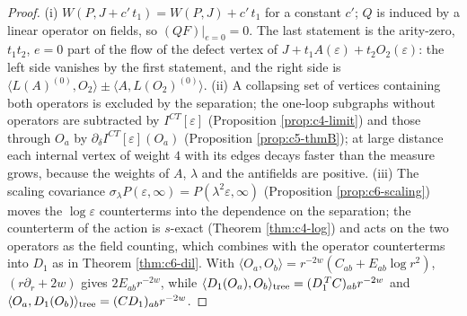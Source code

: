 \begin{proof}
(i) $W(P,J+c'\,t_1)=W(P,J)+c'\,t_1$ for a constant $c'$; $Q$ is induced by a linear operator on fields, so $(QF)|_{e=0}=0$. The last statement is the arity-zero, $t_1t_2$, $e=0$ part of the flow of the defect vertex of $J+t_1A(\varepsilon)+t_2O_2(\varepsilon)$: the left side vanishes by the first statement, and the right side is $\langle L(A)^{(0)},O_2\rangle\pm\langle A,L(O_2)^{(0)}\rangle$. (ii) A collapsing set of vertices containing both operators is excluded by the separation; the one-loop subgraphs without operators are subtracted by $I^{CT}[\varepsilon]$ (Proposition \ref{prop:c4-limit}) and those through $O_a$ by $\partial_\delta I^{CT}[\varepsilon](O_a)$ (Proposition \ref{prop:c5-thmB}); at large distance each internal vertex of weight $4$ with its edges decays faster than the measure grows, because the weights of $A$, $\lambda$ and the antifields are positive. (iii) The scaling covariance $\sigma_\lambda P(\varepsilon,\infty)=P(\lambda^2\varepsilon,\infty)$ (Proposition \ref{prop:c6-scaling}) moves the $\log\varepsilon$ counterterms into the dependence on the separation; the counterterm of the action is $s$-exact (Theorem \ref{thm:c4-log}) and acts on the two operators as the field counting, which combines with the operator counterterms into $D_1$ as in Theorem \ref{thm:c6-dil}. With $\langle O_a,O_b\rangle=r^{-2w}(C_{ab}+E_{ab}\log r^2)$, $(r\partial_r+2w)$ gives $2E_{ab}r^{-2w}$, while $\langle D_1(O_a),O_b\rangle_{\rm tree}=(D_1^{\,T}C)_{ab}r^{-2w}$ and $\langle O_a,D_1(O_b)\rangle_{\rm tree}=(CD_1)_{ab}r^{-2w}$.
\end{proof}

